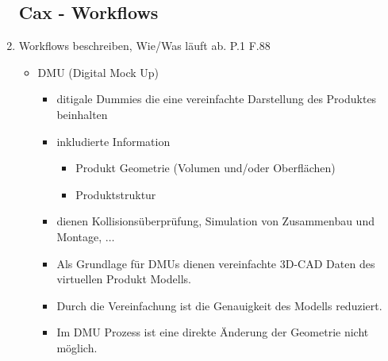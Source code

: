 \documentclass[10pt,a4paper,fleqn]{article}
\begin{document}
\begin{enumerate}
\subsection{Cax - Workflows}
	\item Workflows beschreiben, Wie/Was läuft ab.
		P.1 F.88
			\begin{itemize}
				\item DMU (Digital Mock Up)
					\begin{itemize}
						\item ditigale Dummies die eine vereinfachte Darstellung des Produktes beinhalten
						\item inkludierte Information
							\begin{itemize}
								\item Produkt Geometrie (Volumen und/oder Oberflächen)
								\item Produktstruktur
							\end{itemize}
						\item dienen Kollisionsüberprüfung, Simulation von Zusammenbau und Montage, $\dots$
						\item Als Grundlage für DMUs dienen vereinfachte 3D-CAD Daten des virtuellen Produkt Modells.
						\item Durch die Vereinfachung ist die Genauigkeit des Modells reduziert.
						\item Im DMU Prozess ist eine direkte Änderung der Geometrie nicht möglich.
						

\end{itemize}
\end{itemize}
\end{enumerate}
\end{document}
